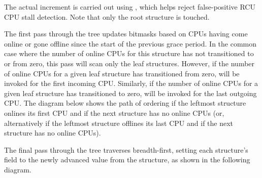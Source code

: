 The actual increment is carried out using , which
helps reject false-positive RCU CPU stall detection. Note that only the
root  structure is touched.

The first pass through the  tree updates bitmasks based on
CPUs having come online or gone offline since the start of the previous
grace period.
In the common case where the number of online CPUs for
this  structure has not transitioned to or from zero, this
pass will scan only the leaf  structures.
However, if the
number of online CPUs for a given leaf  structure has
transitioned from zero,  will be invoked for the
first incoming CPU\@.
Similarly, if the number of online CPUs for a given
leaf  structure has transitioned to zero,
 will be invoked for the last outgoing CPU\@.
The diagram below shows the path of ordering if the leftmost
 structure onlines its first CPU and if the next
 structure has no online CPUs (or, alternatively if the
leftmost  structure offlines its last CPU and if the next
 structure has no online CPUs).

\begin{center}
\end{center}

The final  pass through the  tree traverses
breadth-first, setting each  structure's  field
to the newly advanced value from the  structure, as shown
in the following diagram.

